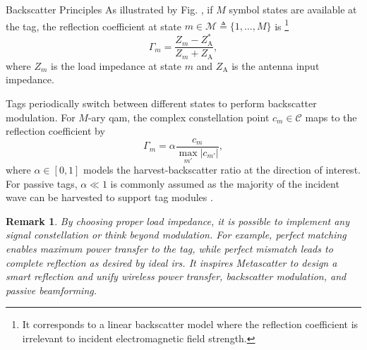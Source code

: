 \documentclass[journal]{IEEEtran}
\newtheorem{remark}{Remark}
\begin{document}
\begin{section}{Backscatter Principles}
	As illustrated by Fig. , if $M$ symbol states are available at the tag, the reflection coefficient at state $m \in \mathcal{M} \triangleq \{1,\ldots,M\}$ is
	\footnote{
		It corresponds to a linear backscatter model where the reflection coefficient is irrelevant to incident electromagnetic field strength.
	}
	\begin{equation}
		\Gamma_m = \frac{Z_m - Z_{\mathrm{A}}^*}{Z_m + Z_{\mathrm{A}}},
		\label{eq:reflection_coefficient}
	\end{equation}
	where $Z_m$ is the load impedance at state $m$ and $Z_{\mathrm{A}}$ is the antenna input impedance.

	Tags periodically switch between different states to perform backscatter modulation.
	For $M$-ary \gls{qam}, the complex constellation point $c_m \in \mathcal{C}$ maps to the reflection coefficient by \cite{Thomas2012a}
	\begin{equation}
		\Gamma_m = \alpha \frac{c_m}{\max_{m'} \lvert c_{m'} \rvert},
		\label{eq:backscatter_modulation}
	\end{equation}
	where $\alpha \in [0,1]$ models the harvest-backscatter ratio at the direction of interest.
	For passive tags, $\alpha \ll 1$ is commonly assumed as the majority of the incident wave can be harvested to support tag modules \cite{Thomas2012a}.

	\begin{remark}
		By choosing proper load impedance, it is possible to implement any signal constellation or think beyond modulation.
		For example, perfect matching enables maximum power transfer to the tag, while perfect mismatch leads to complete reflection as desired by ideal \gls{irs}.
		It inspires Metascatter to design a smart reflection and unify wireless power transfer, backscatter modulation, and passive beamforming.
	\end{remark}
\end{section}
\end{document}
